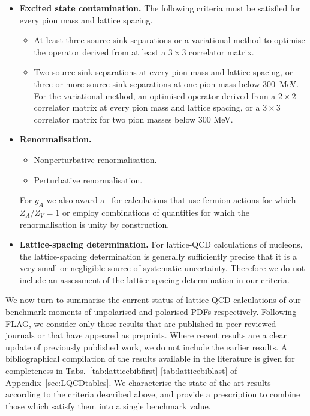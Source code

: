 \begin{itemize}
\item {\bfseries Excited state contamination.} 
The following criteria must be satisfied for every pion mass and lattice 
spacing.
%
\begin{itemize}
%
\item[\bstar] At least three source-sink separations or a variational method 
to optimise the operator derived from at least a $3\times 3$ correlator matrix.
% 
\item[\bcirc] Two source-sink separations at every pion mass and lattice 
spacing, or three or more source-sink separations at one pion mass below 
300~MeV. 
%
For the variational method, an optimised operator derived from a $2\times 2$ 
correlator matrix at every pion mass and lattice spacing, or a $3\times 3$ 
correlator matrix for two pion masses below 300 MeV.
%
\end{itemize}

\item {\bfseries Renormalisation.} 
\begin{itemize}
%
\item[\bstar] Nonperturbative renormalisation.
%
\item[\bcirc] Perturbative renormalisation.
%
\end{itemize}
%
For $g_A$ we also award a \bstar~for calculations that use fermion actions 
for which $Z_A/Z_V=1$ or employ combinations of quantities for which the 
renormalisation is unity by construction.

\item {\bfseries Lattice-spacing determination.} 
For lattice-QCD calculations of nucleons, the lattice-spacing determination is 
generally sufficiently precise that it is a very small or negligible source
of systematic uncertainty. 
%
Therefore we do not include an assessment of the lattice-spacing
determination in our criteria.

\end{itemize}

We now turn to summarise the current status of lattice-QCD calculations of
our benchmark moments of unpolarised and polarised PDFs respectively.
%
Following FLAG, we consider only those results that are published in 
peer-reviewed journals or that have appeared as preprints. 
%
Where recent results are a clear update of previously published work, we do 
not include the earlier results.
%
A bibliographical compilation of the results available in the literature 
is given for completeness in 
Tabs.~\ref{tab:latticebibfirst}-\ref{tab:latticebiblast} 
of Appendix~\ref{sec:LQCDtables}.
%
We characterise the state-of-the-art results according to the criteria 
described above, and provide a prescription to combine those which satisfy 
them into a single benchmark value.

